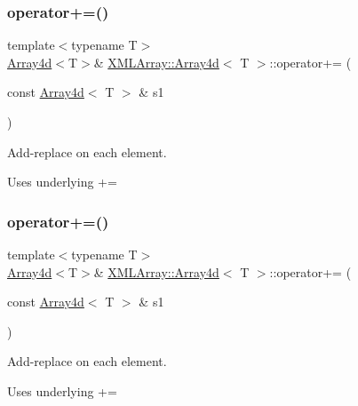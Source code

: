 \subsubsection{\texorpdfstring{operator+=()}{operator+=()}\hspace{0.1cm}{\footnotesize\ttfamily [1/3]}}
{\footnotesize\ttfamily template$<$typename T$>$ \\
\mbox{\hyperlink{classXMLArray_1_1Array4d}{Array4d}}$<$T$>$\& \mbox{\hyperlink{classXMLArray_1_1Array4d}{X\+M\+L\+Array\+::\+Array4d}}$<$ T $>$\+::operator+= (\begin{DoxyParamCaption}\item[{const \mbox{\hyperlink{classXMLArray_1_1Array4d}{Array4d}}$<$ T $>$ \&}]{s1 }\end{DoxyParamCaption})\hspace{0.3cm}{\ttfamily [inline]}}



Add-\/replace on each element. 

Uses underlying += \mbox{\label{classXMLArray_1_1Array4d_a3ee4e8302e86bcfec817cae81a5fe1bf}} 
\subsubsection{\texorpdfstring{operator+=()}{operator+=()}\hspace{0.1cm}{\footnotesize\ttfamily [2/3]}}
{\footnotesize\ttfamily template$<$typename T$>$ \\
\mbox{\hyperlink{classXMLArray_1_1Array4d}{Array4d}}$<$T$>$\& \mbox{\hyperlink{classXMLArray_1_1Array4d}{X\+M\+L\+Array\+::\+Array4d}}$<$ T $>$\+::operator+= (\begin{DoxyParamCaption}\item[{const \mbox{\hyperlink{classXMLArray_1_1Array4d}{Array4d}}$<$ T $>$ \&}]{s1 }\end{DoxyParamCaption})\hspace{0.3cm}{\ttfamily [inline]}}



Add-\/replace on each element. 

Uses underlying += \mbox{\label{classXMLArray_1_1Array4d_a3ee4e8302e86bcfec817cae81a5fe1bf}} 
